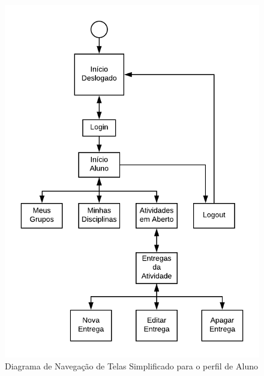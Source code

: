 \begin{figure}[!htpb]
    \centering
    \includegraphics[scale=1.3]{imagens/telas_aluno.png}
    \caption{Diagrama de Navegação de Telas Simplificado para o perfil de Aluno}
    \label{fig:telas-aluno}
\end{figure}

